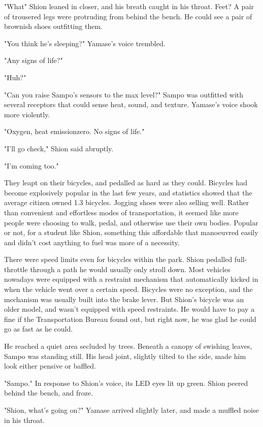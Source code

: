 "What\el " Shion leaned in closer, and his breath caught in his
throat. Feet? A pair of trousered legs were protruding from behind the
bench. He could see a pair of brownish shoes outfitting them.

"You think he's sleeping\el ?" Yamase's voice trembled.

"Any signs of life?"

"Huh?"

"Can you raise Sampo's sensors to the max level?" Sampo was outfitted
with several receptors that could sense heat, sound, and texture.
Yamase's voice shook more violently.

"Oxygen, heat emission\el zero. No signs of life."

"I'll go check," Shion said abruptly.

"I'm coming too."

They leapt on their bicycles, and pedalled as hard as they could.
Bicycles had become explosively popular in the last few years, and
statistics showed that the average citizen owned 1.3 bicycles. Jogging
shoes were also selling well. Rather than convenient and effortless
modes of transportation, it seemed like more people were choosing to
walk, pedal, and otherwise use their own bodies. Popular or not, for a
student like Shion, something this affordable that manoeuvred easily and
didn't cost anything to fuel was more of a necessity.

There were speed limits even for bicycles within the park. Shion
pedalled full-throttle through a path he would usually only stroll down.
Most vehicles nowadays were equipped with a restraint mechanism that
automatically kicked in when the vehicle went over a certain speed.
Bicycles were no exception, and the mechanism was usually built into the
brake lever. But Shion's bicycle was an older model, and wasn't equipped
with speed restraints. He would have to pay a fine if the Transportation
Bureau found out, but right now, he was glad he could go as fast as he
could.

He reached a quiet area secluded by trees. Beneath a canopy of swishing
leaves, Sampo was standing still. His head joint, slightly tilted to the
side, made him look either pensive or baffled.

"Sampo." In response to Shion's voice, its LED eyes lit up green. Shion
peered behind the bench, and froze.

"Shion, what's going on?" Yamase arrived slightly later, and made a
muffled noise in his throat.

